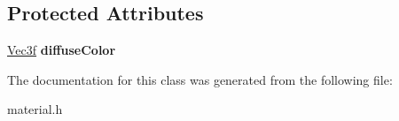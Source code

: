 \subsection*{\-Protected \-Attributes}
\begin{DoxyCompactItemize}
\item 
\hypertarget{classMaterial_ae81bccaee22b88d46074b843dc7bdc32}{\hyperlink{classVec3f}{\-Vec3f} {\bfseries diffuse\-Color}}\label{classMaterial_ae81bccaee22b88d46074b843dc7bdc32}

\end{DoxyCompactItemize}


\-The documentation for this class was generated from the following file\-:\begin{DoxyCompactItemize}
\item 
material.\-h\end{DoxyCompactItemize}
